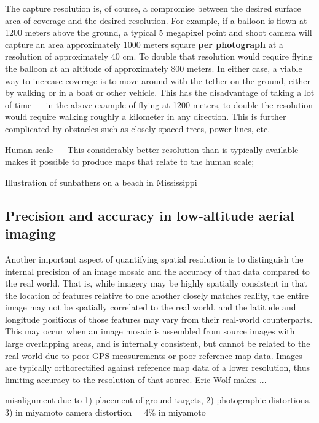 \documentclass[11pt]{report}
\begin{document}
The capture resolution is, of course, a compromise between the desired surface area of coverage and the desired resolution. For example, if a balloon is flown at 1200 meters above the ground, a typical 5 megapixel point and shoot camera will capture an area approximately 1000 meters square \textbf{per photograph} at a resolution of approximately 40 cm. To double that resolution would require flying the balloon at an altitude of approximately 800 meters. In either case, a viable way to increase coverage is to move around with the tether on the ground, either by walking or in a boat or other vehicle. This has the disadvantage of taking a lot of time --- in the above example of flying at 1200 meters, to double the resolution would require walking roughly a kilometer in any direction. This is further complicated by obstacles such as closely spaced trees, power lines, etc.

Human scale --- This considerably better resolution than is typically available makes it possible to produce maps that relate to the human scale; 

Illustration of sunbathers on a beach in Mississippi

\subsection{Precision and accuracy in low-altitude aerial imaging}

Another important aspect of quantifying spatial resolution is to distinguish the internal precision of an image mosaic and the accuracy of that data compared to the real world. That is, while imagery may be highly spatially consistent in that the location of features relative to one another closely matches reality, the entire image may not be spatially correlated to the real world, and the latitude and longitude positions of those features may vary from their real-world counterparts. This may occur when an image mosaic is assembled from source images with large overlapping areas, and is internally consistent, but cannot be related to the real world due to poor GPS measurements or poor reference map data. Images are typically orthorectified against reference map data of a lower resolution, thus limiting accuracy to the resolution of that source. Eric Wolf makes ...


misalignment due to 1) placement of ground targets, 2) photographic distortions, 3) in miyamoto
camera distortion = 4\% in miyamoto
\end{document}
